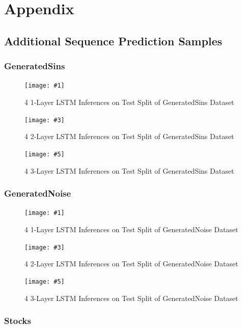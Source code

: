 \documentclass{scrartcl}
\begin{document}
\newpage

\newpage

\newpage
\section{Appendix}
\label{sec:appendix}

\newcommand{\threefig}[6]{
	\begin{figure}[H]
		\centering
		\texttt{[image: \#1]}
		\caption{#2}
	\end{figure}
	\begin{figure}[H]
		\centering
		\texttt{[image: \#3]}
		\caption{#4}
	\end{figure}
	\begin{figure}[H]
		\centering
		\texttt{[image: \#5]}
		\caption{#6}
	\end{figure}
}

\subsection{Additional Sequence Prediction Samples}
\label{subsec:additional_sequence_inferences}

\subsubsection{GeneratedSins}
\label{subsubsec:additional_sins_inferences}

\threefig
{inferences/sins/app_1layer_s29.png}
{4 1-Layer LSTM Inferences on Test Split of GeneratedSins Dataset}
{inferences/sins/app_2layer_s30.png}
{4 2-Layer LSTM Inferences on Test Split of GeneratedSins Dataset}
{inferences/sins/app_3layer_s33.png}
{4 3-Layer LSTM Inferences on Test Split of GeneratedSins Dataset}

\subsubsection{GeneratedNoise}
\label{subsubsec:additional_noise_inferences}

\threefig
{inferences/noise/app_1layer_s29.png}
{4 1-Layer LSTM Inferences on Test Split of GeneratedNoise Dataset}
{inferences/noise/app_2layer_s30.png}
{4 2-Layer LSTM Inferences on Test Split of GeneratedNoise Dataset}
{inferences/noise/app_3layer_s32.png}
{4 3-Layer LSTM Inferences on Test Split of GeneratedNoise Dataset}

\subsubsection{Stocks}
\label{subsubsec:additional_stocks_inferences}
\end{document}
